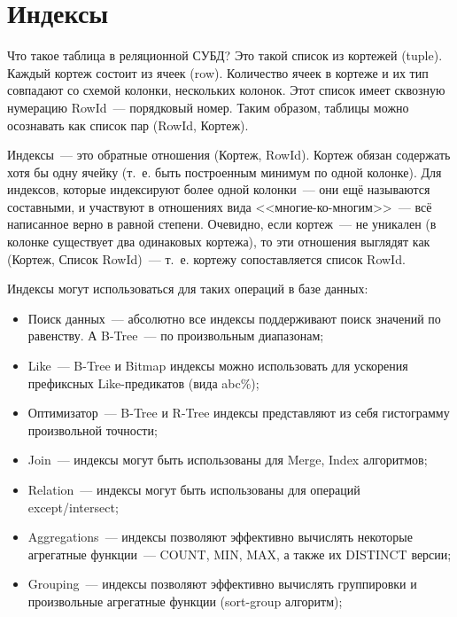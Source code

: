 \chapter{Индексы}

\begin{epigraphs}
\end{epigraphs}

Что такое таблица в реляционной СУБД? Это такой список из кортежей (tuple). Каждый кортеж состоит из ячеек (row). Количество ячеек в кортеже и их тип совпадают со схемой колонки, нескольких колонок. Этот список имеет сквозную нумерацию RowId~--- порядковый номер. Таким образом, таблицы можно осознавать как список пар (RowId, Кортеж).

Индексы~--- это обратные отношения (Кортеж, RowId). Кортеж обязан содержать хотя бы одну ячейку (т.~е. быть построенным минимум по одной колонке). Для индексов, которые индексируют более одной колонки~--- они ещё называются составными, и участвуют в отношениях вида <<многие-ко-многим>>~--- всё написанное верно в равной степени. Очевидно, если кортеж~--- не уникален (в колонке существует два одинаковых кортежа), то эти отношения выглядят как (Кортеж, Список RowId)~--- т.~е. кортежу сопоставляется список RowId.

Индексы могут использоваться для таких операций в базе данных:

\begin{itemize}
  \item Поиск данных~--- абсолютно все индексы поддерживают поиск значений по равенству. А B-Tree~--- по произвольным диапазонам;
  \item Like~--- B-Tree и Bitmap индексы можно использовать для ускорения префиксных Like-предикатов (вида abc\%);
  \item Оптимизатор~--- B-Tree и R-Tree индексы представляют из себя гистограмму произвольной точности;
  \item Join~--- индексы могут быть использованы для Merge, Index алгоритмов;
  \item Relation~--- индексы могут быть использованы для операций except/intersect;
  \item Aggregations~--- индексы позволяют эффективно вычислять некоторые агрегатные функции~--- COUNT, MIN, MAX, а также их DISTINCT версии;
  \item Grouping~--- индексы позволяют эффективно вычислять группировки и произвольные агрегатные функции (sort-group алгоритм);
\end{itemize}




